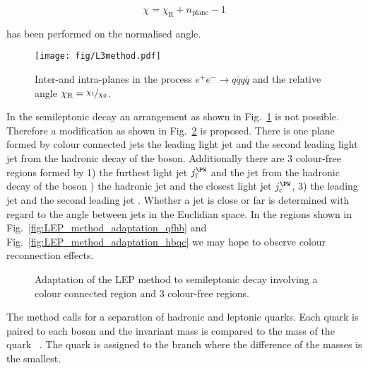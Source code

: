 \begin{equation}
  \chi=\chi_{\text{R}}+n_{\text{plane}}-1
\end{equation}

\noindent has been performed on the normalised angle. 

\begin{figure}[hbtp]
  \centering
  \texttt{[image: fig/L3method.pdf]}
  \caption{Inter-\PW and intra-\PW planes in the process $e^{+}e^{-}\rightarrow q\overline{q}q\overline{q}$ and the relative angle $\chi_{\text{R}}=\nicefrac{\chi_{1}}{\chi_{0}}$.}
  \label{fig:LEP_method}
\end{figure}

In the \ttbar semileptonic decay an arrangement as shown in Fig.~\ref{fig:LEP_method} is not possible. Therefore a modification as shown in Fig.~\ref{fig:LEP_method_adaptation} is proposed. There is one plane formed by colour connected jets \textendash the leading light jet \leadingjet and the second leading light jet \scndleadingjet from the hadronic decay of the \PW boson. Additionally there are 3 colour-free regions formed by 1) the furthest light jet $j^{\PW}_{\text{f}}$ and the \cPqb jet from the hadronic decay of the \PW boson ) the hadronic \cPqb jet and the closest light jet $j^{\PW}_{\text{c}}$, 3) the leading \cPqb jet \leadingb and the second leading \cPqb jet \scndleadingb. Whether a jet is close or far is determined with regard to the angle between jets in the Euclidian space. In the regions shown in Fig.~\ref{fig:LEP_method_adaptation_qfhb} and Fig.~\ref{fig:LEP_method_adaptation_hbqc} we may hope to observe colour reconnection effects.

\begin{figure}[hbtp]
  \centering
  \def\twidth{0.24}
  \hfil
 \hfil
  \hfil
  \caption{Adaptation of the LEP method to \ttbar semileptonic decay involving a colour \textendash connected region and 3 colour-free regions.}
  \label{fig:LEP_method_adaptation}
\end{figure}

The method calls for a separation of hadronic and leptonic \cPqb quarks. Each \cPqb quark is paired to each \PW boson and the invariant mass is compared to the mass of the \cPqt quark ~\GeV. The \cPqb quark is assigned to the branch where the difference of the masses is the smallest. 

